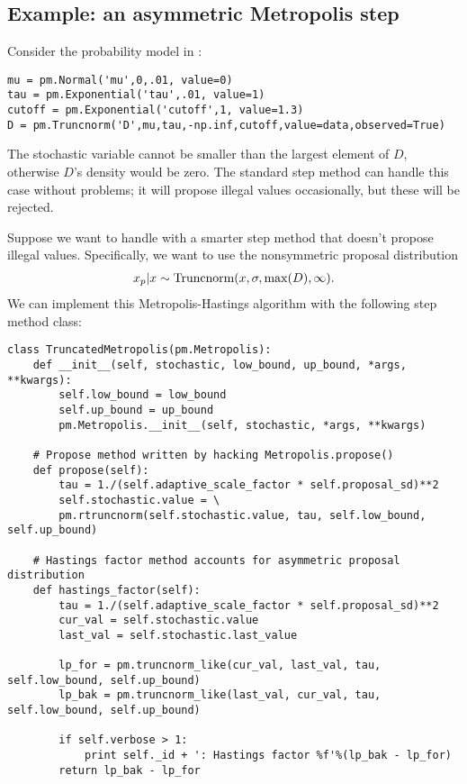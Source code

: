 \hypertarget{custom_stepper_example}{}
\subsection{Example: an asymmetric Metropolis step} \label{user-gen}
Consider the probability model in :
\begin{verbatim}
mu = pm.Normal('mu',0,.01, value=0)
tau = pm.Exponential('tau',.01, value=1)
cutoff = pm.Exponential('cutoff',1, value=1.3)
D = pm.Truncnorm('D',mu,tau,-np.inf,cutoff,value=data,observed=True)
\end{verbatim}
The stochastic variable  cannot be smaller than the largest element of $D$, otherwise $D$'s density would be zero. The standard  step method can handle this case without problems; it will propose illegal values occasionally, but these will be rejected.

\medskip
Suppose we want to handle  with a smarter step method that doesn't propose illegal values. Specifically, we want to use the nonsymmetric proposal distribution
\begin{eqnarray*}
	x_p | x \sim \textup{Truncnorm}(x, \sigma, \max(D), \infty).
\end{eqnarray*}
We can implement this Metropolis-Hastings algorithm with the following step method class:
\begin{verbatim}
class TruncatedMetropolis(pm.Metropolis):
    def __init__(self, stochastic, low_bound, up_bound, *args, **kwargs):
        self.low_bound = low_bound
        self.up_bound = up_bound
        pm.Metropolis.__init__(self, stochastic, *args, **kwargs)

    # Propose method written by hacking Metropolis.propose()
    def propose(self):
        tau = 1./(self.adaptive_scale_factor * self.proposal_sd)**2
        self.stochastic.value = \
        pm.rtruncnorm(self.stochastic.value, tau, self.low_bound, self.up_bound)

    # Hastings factor method accounts for asymmetric proposal distribution
    def hastings_factor(self):
        tau = 1./(self.adaptive_scale_factor * self.proposal_sd)**2
        cur_val = self.stochastic.value
        last_val = self.stochastic.last_value

        lp_for = pm.truncnorm_like(cur_val, last_val, tau, self.low_bound, self.up_bound)
        lp_bak = pm.truncnorm_like(last_val, cur_val, tau, self.low_bound, self.up_bound)

        if self.verbose > 1:
            print self._id + ': Hastings factor %f'%(lp_bak - lp_for)
        return lp_bak - lp_for
\end{verbatim}

